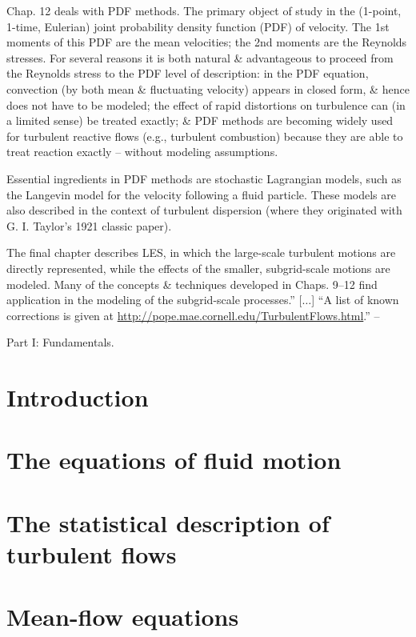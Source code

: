 \documentclass[oneside]{book}
\numberwithin{equation}{section}
\begin{document}
Chap. 12 deals with PDF methods. The primary object of study in the (1-point, 1-time, Eulerian) joint probability density function (PDF) of velocity. The 1st moments of this PDF are the mean velocities; the 2nd moments are the Reynolds stresses. For several reasons it is both natural \& advantageous to proceed from the Reynolds stress to the PDF level of description: in the PDF equation, convection (by both mean \& fluctuating velocity) appears in closed form, \& hence does not have to be modeled; the effect of rapid distortions on turbulence can (in a limited sense) be treated exactly; \& PDF methods are becoming widely used for turbulent reactive flows (e.g., turbulent combustion) because they are able to treat reaction exactly -- without modeling assumptions.

Essential ingredients in PDF methods are stochastic Lagrangian models, such as the Langevin model for the velocity following a fluid particle. These models are also described in the context of turbulent dispersion (where they originated with G. I. Taylor's 1921 classic paper).

The final chapter describes LES, in which the large-scale turbulent motions are directly represented, while the effects of the smaller, subgrid-scale motions are modeled. Many of the concepts \& techniques developed in Chaps. 9--12 find application in the modeling of the subgrid-scale processes.'' [$\ldots$] ``A list of known corrections is given at \url{http://pope.mae.cornell.edu/TurbulentFlows.html}.'' -- \cite[Preface, pp. xvii--]{Pope2000}

\begin{center}\huge
	Part I: Fundamentals.
\end{center}

\section{Introduction}

\section{The equations of fluid motion}

\section{The statistical description of turbulent flows}

\section{Mean-flow equations}
\end{document}
